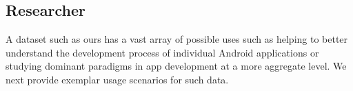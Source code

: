 \documentclass[journal,transmag]{IEEEtran}
\newcommand{\todo}[1]{\textcolor{cyan}{\textbf{[#1]}}}
\newcommand{\dan}[1]{\textcolor{blue}{{\it [Dan says: #1]}}}
\begin{document}













%



%







\subsection{Researcher}

%


A dataset such as ours has a vast array of possible uses such as helping to better understand the development process of individual Android applications or studying dominant paradigms in app development at a more aggregate level. We next provide exemplar usage scenarios for such data. \\
\end{document}
